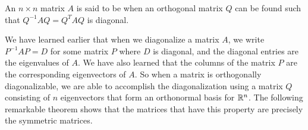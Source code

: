 \documentclass{ximera}
\begin{document}
\begin{definition}
An $n \times n$ matrix $A$ is said to be  when an orthogonal matrix $Q$ can be found such that  $Q^{-1}AQ = Q^{T}AQ$ is diagonal.
\end{definition}

We have learned earlier that when we diagonalize a matrix $A$, we write $P^{-1}AP=D$ for some matrix $P$ where $D$ is diagonal, and the diagonal entries are the eigenvalues of $A$.  We have also learned that the columns of the matrix $P$ are the corresponding eigenvectors of $A$.  So when a matrix is orthogonally diagonalizable, we are able to accomplish the diagonalization using a matrix $Q$ consisting of $n$ eigenvectors that form an orthonormal basis for $\mathbb{R}^n$.  The following remarkable theorem shows that the matrices that have this property are precisely the symmetric matrices.
\end{document}
